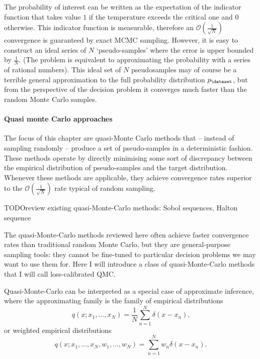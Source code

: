The probability of interest can be written as the expectation of the indicator function that takes value $1$ if the temperature exceeds the critical one and $0$ otherwise. This indicator function is measurable, therefore an $\mathcal{O}(\frac{1}{\sqrt{N}})$ convergence is guaranteed by exact MCMC sampling.
However, it is easy to construct an ideal series of $N$ `pseudo-samples' where the error is upper bounded by $\frac{1}{N}$. (The problem is equivalent to approximating the probability with a series of rational numbers). This ideal set of $N$ pseudosamples may of course be a terrible general approximation to the full probability distribution $p_\dataset$, but from the perspective of the decision problem it converges much faster than the random Monte Carlo samples.


\paragraph{Quasi monte Carlo approaches}

 The focus of this chapter are quasi-Monte Carlo methods that -- instead of sampling randomly -- produce a set of pseudo-samples in a deterministic fashion. These methods operate by directly minimising some sort of discrepancy between the empirical distribution of pseudo-samples and the target distribution. Whenever these methods are applicable, they achieve convergence rates superior to the $\mathcal{O}(\frac{1}{\sqrt{N}})$ rate typical of random sampling.

TODO{review existing quasi-Monte-Carlo methods: Sobol sequences, Halton sequence}

The quasi-Monte-Carlo methods reviewed here often achieve faster convergence rates than traditional random Monte Carlo, but they are general-purpose sampling tools: they cannot be fine-tuned to particular decision problems we may want to use them for. Here I will introduce a class of quasi-Monte-Carlo methods that I will call loss-calibrated QMC. 

Quasi-Monte-Carlo can be interpreted as a special case of approximate inference, where the approximating family is the family of empirical distributions
\begin{equation}
	q(x ; x_1,\ldots,x_N) = \frac{1}{N} \sum_{n=1}^{N} \delta(x - x_n)\mbox{,}
\end{equation}
or weighted empirical distributions
\begin{equation}
	q(x ; x_1,\ldots,x_N,w_1,\ldots,w_N) = \sum_{n=1}^{N} w_n \delta(x - x_n)\mbox{.}
\end{equation}

